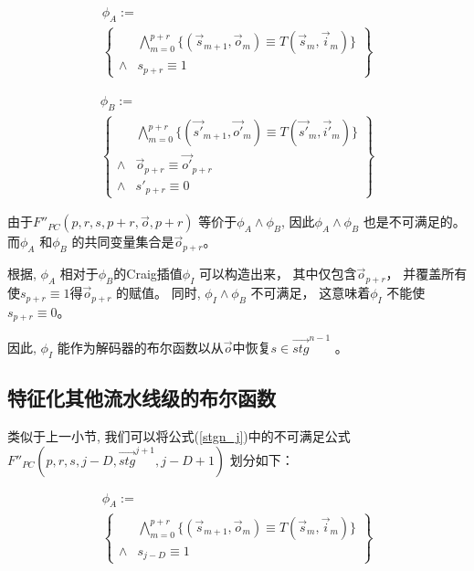 \begin{multline}
 \phi_A := \\
 \left\{
\begin{array}{cc}
&\bigwedge_{m=0}^{p+r}
\{
(\vec{s}_{m+1},\vec{o}_m)\equiv T(\vec{s}_m,\vec{i}_m)
\}
\\
\wedge& s_{p+r}\equiv 1
\end{array}
\right\}
\end{multline}

\begin{multline}
\phi_B := \\
\left\{
\begin{array}{cc}
&\bigwedge_{m=0}^{p+r}
\{
(\vec{s'}_{m+1},\vec{o'}_m)\equiv T(\vec{s'}_m,\vec{i'}_m)
\}
\\
\wedge&\vec{o}_{p+r}\equiv \vec{o'}_{p+r} \\
\wedge& s'_{p+r}\equiv 0
\end{array}
\right\}
\end{multline}

由于$F''_{PC}(p,r,s,p+r,\vec{o},p+r)$ 等价于$\phi_A \wedge \phi_B$,
因此$\phi_A \wedge \phi_B$ 也是不可满足的。
而$\phi_A$ 和$\phi_B$ 的共同变量集合是$\vec{o}_{p+r}$。

根据\cite{InterpBoolFunction},
$\phi_A$ 相对于$\phi_B$的Craig插值$\phi_I$  可以构造出来，
其中仅包含$\vec{o}_{p+r}$，
并覆盖所有使$s_{p+r}\equiv 1$得$\vec{o}_{p+r}$ 的赋值。
同时,
$\phi_I\wedge \phi_B$  不可满足，
这意味着$\phi_I$ 不能使$s_{p+r}\equiv 0$。

因此,
$\phi_I$ 能作为解码器的布尔函数以从$\vec{o}$中恢复$s\in \vec{stg}^{n-1}$ 。

\subsection{特征化其他流水线级的布尔函数}
类似于上一小节,
我们可以将公式(\ref{stgn_j})中的不可满足公式$F''_{PC}(p,r,s,j-D,\vec{stg}^{j+1},j-D+1)$
划分如下：

\begin{multline}
 \phi_A := \\
 \left\{
\begin{array}{cc}
&\bigwedge_{m=0}^{p+r}
\{
(\vec{s}_{m+1},\vec{o}_m)\equiv T(\vec{s}_m,\vec{i}_m)
\}
\\
\wedge& s_{j-D}\equiv 1
\end{array}
\right\}
\end{multline}

